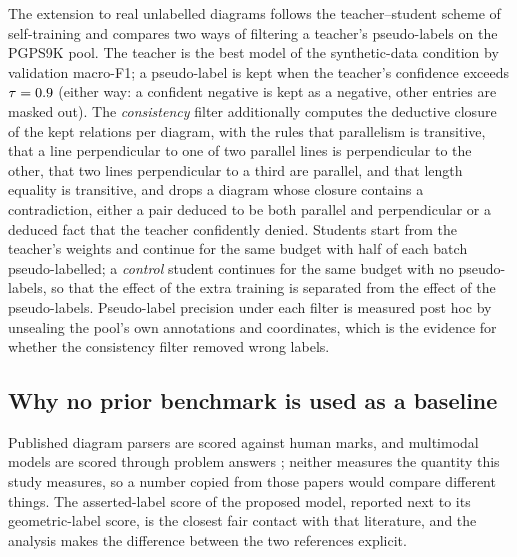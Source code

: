 The extension to real unlabelled diagrams follows the teacher--student scheme of self-training \cite{xie2020noisystudent} and compares two ways of filtering a teacher's pseudo-labels on the PGPS9K pool. The teacher is the best model of the synthetic-data condition by validation macro-F1; a pseudo-label is kept when the teacher's confidence exceeds $\tau=0.9$ (either way: a confident negative is kept as a negative, other entries are masked out). The \emph{consistency} filter additionally computes the deductive closure of the kept relations per diagram, with the rules that parallelism is transitive, that a line perpendicular to one of two parallel lines is perpendicular to the other, that two lines perpendicular to a third are parallel, and that length equality is transitive, and drops a diagram whose closure contains a contradiction, either a pair deduced to be both parallel and perpendicular or a deduced fact that the teacher confidently denied. Students start from the teacher's weights and continue for the same budget with half of each batch pseudo-labelled; a \emph{control} student continues for the same budget with no pseudo-labels, so that the effect of the extra training is separated from the effect of the pseudo-labels. Pseudo-label precision under each filter is measured post hoc by unsealing the pool's own annotations and coordinates, which is the evidence for whether the consistency filter removed wrong labels.

\subsection{Why no prior benchmark is used as a baseline}

Published diagram parsers \cite{lu2021intergps,zhang2022pgdp} are scored against human marks, and multimodal models are scored through problem answers \cite{zhang2024mathverse}; neither measures the quantity this study measures, so a number copied from those papers would compare different things. The asserted-label score of the proposed model, reported next to its geometric-label score, is the closest fair contact with that literature, and the \Htwo{} analysis makes the difference between the two references explicit.
